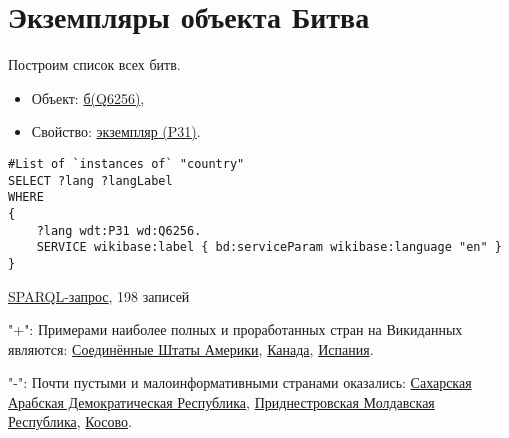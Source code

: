 \section{Экземпляры объекта Битва}

Построим список всех битв.

\begin{itemize}
    \item Объект: \href{https://www.wikidata.org/wiki/Q6256}{б(Q6256)},
    \item Свойство: \href{https://www.wikidata.org/wiki/Property:P31}{экземпляр (P31)}.
\end{itemize}

\begin{lstlisting}[language=SPARQL]
#List of `instances of` "country" 
SELECT ?lang ?langLabel
WHERE
{
    ?lang wdt:P31 wd:Q6256.
    SERVICE wikibase:label { bd:serviceParam wikibase:language "en" }
}
\end{lstlisting}

\href{https://query.wikidata.org/#%23added%202017-02%0A%23List%20of%20%60instances%20of%60%20%22country%22%20%0ASELECT%20%3Flang%20%3FlangLabel%0AWHERE%0A%7B%0A%20%20%20%20%3Flang%20wdt%3AP31%20wd%3AQ6256.%0A%20%20%20%20SERVICE%20wikibase%3Alabel%20%7B%20bd%3AserviceParam%20wikibase%3Alanguage%20%22en%22%20%7D%0A%7D}{SPARQL-запрос}, 198 записей

"+": Примерами наиболее полных и проработанных стран на Викиданных являются:
\href{https://www.wikidata.org/wiki/Q30}{Соединённые Штаты Америки}, 
\href{https://www.wikidata.org/wiki/Q16}{Канада},
\href{https://www.wikidata.org/wiki/Q29}{Испания}.

"-": Почти пустыми и малоинформативными странами оказались:
\href{https://www.wikidata.org/wiki/Q40362}{Сахарская Арабская Демократическая Республика},
\href{https://www.wikidata.org/wiki/Q907112}{Приднестровская Молдавская Республика},
\href{https://www.wikidata.org/wiki/Q1246}{Косово}.